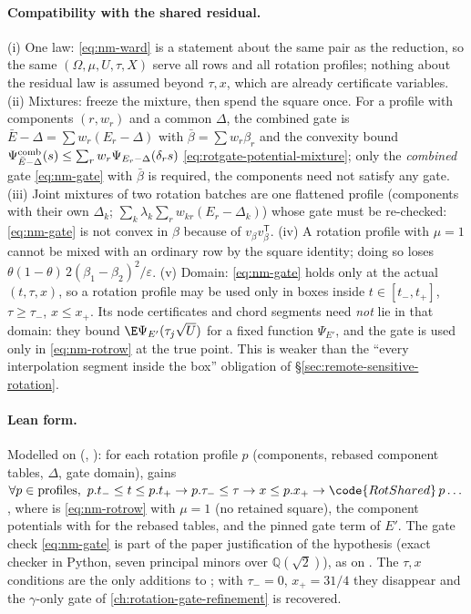 \paragraph{Compatibility with the shared residual.}\label{sec:nearmax-mix} (i) One law: \eqref{eq:nm-ward} is a statement about the same pair as the reduction, so the same
$(\Omega,\mu,U,\tau,X)$ serve all rows and all rotation profiles; nothing about the residual law is assumed beyond $\tau,x$, which are already certificate variables. (ii) Mixtures:
freeze the mixture, then spend the square once. For a profile with components $(r,w_r)$ and a common $\Delta$, the combined gate is $\bar E-\Delta=\sum w_r(E_r-\Delta)$ with
$\bar\beta=\sum w_r\beta_r$ and the convexity bound $\Psi_{\bar E-\Delta}^{\rm comb}(s)\le\sum_rw_r\Psi_{E_r-\Delta}(\delta_rs)$ \eqref{eq:rotgate-potential-mixture}; only the
\emph{combined} gate \eqref{eq:nm-gate} with $\bar\beta$ is required, the components need not satisfy any gate. (iii) Joint mixtures of two rotation batches are one flattened
profile (components with their own $\Delta_k$; $\sum_k\lambda_k\sum_rw_{kr}(E_r-\Delta_k)$) whose gate must be re-checked: \eqref{eq:nm-gate} is not convex in $\beta$ because of
$v_\beta v_\beta^{\mathsf T}$. (iv) A rotation profile with $\mu=1$ cannot be mixed with an ordinary row by the square identity; doing so loses
$\theta(1-\theta)\,2(\beta_1-\beta_2)^2/\varepsilon$. (v) Domain: \eqref{eq:nm-gate} holds only at the actual $(t,\tau,x)$, so a rotation profile may be used only in boxes inside
$t\in[t_-,t_+]$, $\tau\ge\tau_-$, $x\le x_+$. Its node certificates and chord segments need \emph{not} lie in that domain: they bound $\E\Psi_{E'}(\tau_j\sqrt U)$ for a fixed function
$\Psi_{E'}$, and the gate is used only in \eqref{eq:nm-rotrow} at the true point. This is weaker than the ``every interpolation segment inside the box'' obligation of
\S\ref{sec:remote-sensitive-rotation}.

\paragraph{Lean form.} Modelled on  (, ): for each rotation profile $p$ (components, rebased component tables,
$\Delta$, gate domain),  gains
$\forall p\in\text{profiles},\ p.t_-\le t\le p.t_+\to p.\tau_-\le\tau\to x\le p.x_+\to\code{RotShared}\,p\ldots$, where  is \eqref{eq:nm-rotrow} with $\mu=1$ (no retained
square), the component potentials with  for the rebased tables, and the pinned gate term of $E'$. The gate check \eqref{eq:nm-gate} is part of the paper
justification of the hypothesis (exact checker in Python, seven principal minors over $\mathbb Q(\sqrt2)$), as on . The $\tau,x$ conditions are the only additions to
; with $\tau_-=0$, $x_+=31/4$ they disappear and the $\gamma$-only gate of \autoref{ch:rotation-gate-refinement} is recovered.

